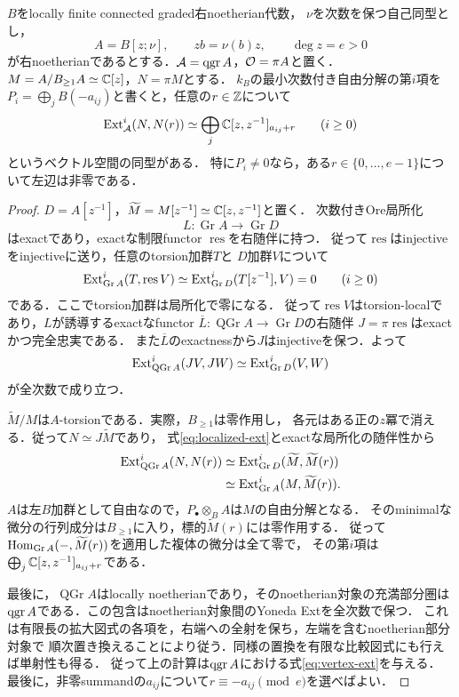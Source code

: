 \documentclass[11pt,a4paper]{ltjsarticle}
\begin{document}
\begin{lemma}[分裂拡大の頂点対象のExt]\label{lem:split-vertex}
$B$をlocally finite connected graded右noetherian代数，
$\nu$を次数を保つ自己同型とし，
\[
 A=B[z;\nu],\qquad zb=\nu(b)z,\qquad \deg z=e>0
\]
が右noetherianであるとする．$\mathcal A=\operatorname{qgr} A$，$\mathcal O=\pi A$と置く．
$M=A/B_{\geq1}A\simeq\mathbb C[z]$，$N=\pi M$とする．
$k_B$の最小次数付き自由分解の第$i$項を
$P_i=\bigoplus_jB(-a_{ij})$と書くと，任意の$r\in\mathbb Z$について
\begin{equation}\label{eq:vertex-ext}
 \operatorname{Ext}^i_{\mathcal A}(N,N(r))
 \simeq\bigoplus_j\mathbb C[z,z^{-1}]_{a_{ij}+r}
 \qquad(i\geq0)
\end{equation}
というベクトル空間の同型がある．
特に$P_i\ne0$なら，ある$r\in\{0,\ldots,e-1\}$について左辺は非零である．
\end{lemma}
\begin{proof}
$D=A[z^{-1}]$，$\widetilde M=M[z^{-1}]\simeq\mathbb C[z,z^{-1}]$と置く．
次数付きOre局所化
\[
 L:\operatorname{Gr}A\longrightarrow\operatorname{Gr}D
\]
はexactであり，exactな制限functor $\operatorname{res}$を右随伴に持つ．
従って$\operatorname{res}$はinjectiveをinjectiveに送り，任意のtorsion加群$T$と
$D$加群$V$について
\[
 \operatorname{Ext}^i_{\operatorname{Gr}A}(T,\operatorname{res}V)
 \simeq\operatorname{Ext}^i_{\operatorname{Gr}D}(T[z^{-1}],V)=0
 \qquad(i\geq0)
\]
である．ここでtorsion加群は局所化で零になる．
従って$\operatorname{res}V$はtorsion-localであり，$L$が誘導するexactなfunctor
$\overline L:\operatorname{QGr}A\to\operatorname{Gr}D$の右随伴
$J=\pi\operatorname{res}$はexactかつ完全忠実である．
また$\overline L$のexactnessから$J$はinjectiveを保つ．よって
\begin{equation}\label{eq:localized-ext}
 \operatorname{Ext}^i_{\operatorname{QGr}A}(JV,JW)
 \simeq\operatorname{Ext}^i_{\operatorname{Gr}D}(V,W)
\end{equation}
が全次数で成り立つ．

$\widetilde M/M$は$A$-torsionである．実際，$B_{\geq1}$は零作用し，
各元はある正の$z$冪で消える．従って$N\simeq J\widetilde M$であり，
式\eqref{eq:localized-ext}とexactな局所化の随伴性から
\begin{align*}
 \operatorname{Ext}^i_{\operatorname{QGr}A}(N,N(r))
 &\simeq\operatorname{Ext}^i_{\operatorname{Gr}D}(\widetilde M,\widetilde M(r))\\
 &\simeq\operatorname{Ext}^i_{\operatorname{Gr}A}(M,\widetilde M(r)).
\end{align*}
$A$は左$B$加群として自由なので，$P_\bullet\otimes_B A$は$M$の自由分解となる．
そのminimalな微分の行列成分は$B_{\geq1}$に入り，標的$\widetilde M(r)$には零作用する．
従って$\operatorname{Hom}_{\operatorname{Gr}A}(-,\widetilde M(r))$を適用した複体の微分は全て零で，
その第$i$項は$\bigoplus_j\mathbb C[z,z^{-1}]_{a_{ij}+r}$である．

最後に，$\operatorname{QGr}A$はlocally noetherianであり，そのnoetherian対象の充満部分圏は
$\operatorname{qgr} A$である．この包含はnoetherian対象間のYoneda Extを全次数で保つ．
これは有限長の拡大図式の各項を，右端への全射を保ち，左端を含むnoetherian部分対象で
順次置き換えることにより従う．同様の置換を有限な比較図式にも行えば単射性も得る．
従って上の計算は$\operatorname{qgr} A$における式\eqref{eq:vertex-ext}を与える．
最後に，非零summandの$a_{ij}$について$r\equiv-a_{ij}\pmod e$を選べばよい．
\end{proof}
\end{document}
